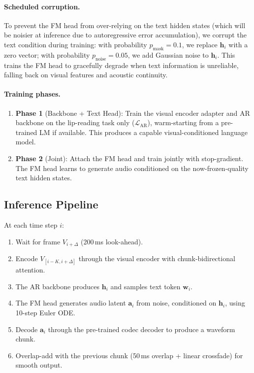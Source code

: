 \documentclass{article}
\begin{document}
\paragraph{Scheduled corruption.} To prevent the FM head from over-relying on the text hidden states (which will be noisier at inference due to autoregressive error accumulation), we corrupt the text condition during training: with probability $p_{\text{mask}}{=}0.1$, we replace $\mathbf{h}_i$ with a zero vector; with probability $p_{\text{noise}}{=}0.05$, we add Gaussian noise to $\mathbf{h}_i$. This trains the FM head to gracefully degrade when text information is unreliable, falling back on visual features and acoustic continuity.

\paragraph{Training phases.}
\begin{enumerate}
    \item \textbf{Phase 1} (Backbone + Text Head): Train the visual encoder adapter and AR backbone on the lip-reading task only ($\mathcal{L}_{\text{AR}}$), warm-starting from a pre-trained LM if available. This produces a capable visual-conditioned language model.
    \item \textbf{Phase 2} (Joint): Attach the FM head and train jointly with stop-gradient. The FM head learns to generate audio conditioned on the now-frozen-quality text hidden states.
\end{enumerate}

\subsection{Inference Pipeline}

At each time step $i$:
\begin{enumerate}
    \item Wait for frame $V_{i+\Delta}$ (200\,ms look-ahead).
    \item Encode $V_{[i-K, i+\Delta]}$ through the visual encoder with chunk-bidirectional attention.
    \item The AR backbone produces $\mathbf{h}_i$ and samples text token $\mathbf{w}_i$.
    \item The FM head generates audio latent $\mathbf{a}_i$ from noise, conditioned on $\mathbf{h}_i$, using 10-step Euler ODE.
    \item Decode $\mathbf{a}_i$ through the pre-trained codec decoder to produce a waveform chunk.
    \item Overlap-add with the previous chunk (50\,ms overlap + linear crossfade) for smooth output.
\end{enumerate}
\end{document}
